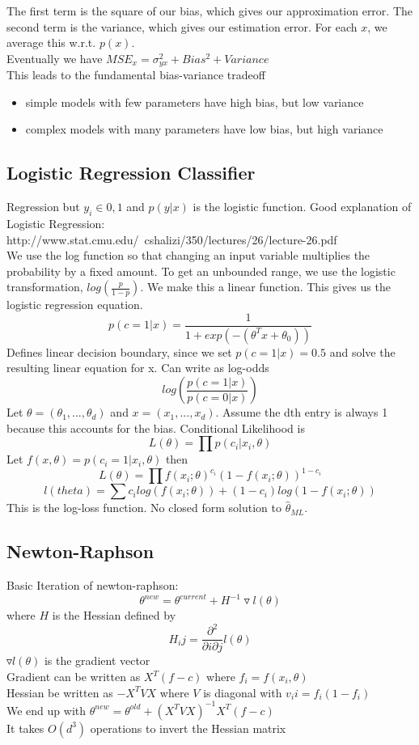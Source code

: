 \documentclass[11pt,psfig]{article}
\begin{document}
The first term is the square of our bias, which gives our approximation error. The second term is the variance, which gives our estimation error. For each $x$, we average this w.r.t. $p(x)$.\\
Eventually we have $MSE_x = \sigma_{yx}^2 + Bias^2 + Variance$\\
This leads to the fundamental bias-variance tradeoff
\begin{itemize}
\item simple models with few parameters have high bias, but low variance
\item complex models with many parameters have low bias, but high variance
\end{itemize}

\subsection*{Logistic Regression Classifier}

Regression but $y_i \in {0,1}$ and $p(y|x)$ is the logistic function. Good explanation of Logistic Regression:\\
http://www.stat.cmu.edu/~cshalizi/350/lectures/26/lecture-26.pdf
\\
We use the log function so that changing an input variable multiplies the probability by a fixed amount. To get an unbounded range, we use the logistic transformation, $log(\frac{p}{1-p})$. We make this a linear function. This gives us the logistic regression equation. \\
\[
p(c=1|x) = \frac{1}{1 + exp(-(\theta^Tx + \theta_0))}
\]
Defines linear decision boundary, since we set $p(c=1|x)=0.5$ and solve the resulting linear equation for x. Can write as log-odds
\[
log(\frac{p(c=1|x)}{p(c=0|x)})
\]
Let $\theta = (\theta_1,...,\theta_d)$ and $x=(x_1,...,x_d)$. Assume the dth entry is always 1 because this accounts for the bias. Conditional Likelihood is
\[
L(\theta) = \prod{p(c_i|x_i,\theta)}
\]
Let $f(x,\theta) = p(c_i=1|x_i,\theta)$ then
\[
L(\theta) = \prod{f(x_i;\theta)^{c_i}(1 - f(x_i;\theta))^{1-c_i}}
\]
\[
l(theta) = \sum{c_i log(f(x_i;\theta)) + (1-c_i)log(1-f(x_i;\theta))}
\]
This is the log-loss function. No closed form solution to $\hat{\theta}_{ML}$. 

\subsection*{Newton-Raphson}
Basic Iteration of newton-raphson:
\[
\theta^{new} = \theta^{current} + H^{-1} \triangledown l(\theta)
\]
where $H$ is the Hessian defined by
\[
H_ij = \frac{\partial^2}{\partial i \partial j} l(\theta)
\]
$\triangledown l(\theta)$ is the gradient vector\\
Gradient can be written as $X^T (f-c)$ where $f_i = f(x_i,\theta)$\\
Hessian be written as $-X^T V X$ where $V$ is diagonal with $v_ii = f_i(1-f_i)$\\
We end up with $\theta^{new} = \theta^{old} + (X^T V X)^{-1} X^T (f-c)$\\
It takes $O(d^3)$ operations to invert the Hessian matrix
\end{document}
